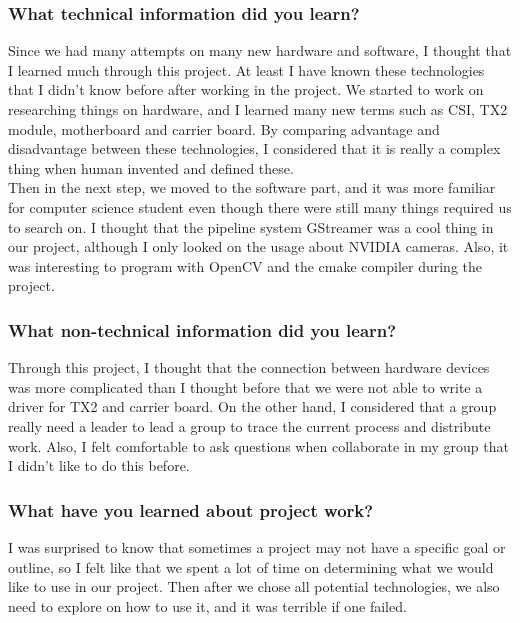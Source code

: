 \subsubsection{What technical information did you learn?}
Since we had many attempts on many new hardware and software, I thought that I learned much through 
this project. At least I have known these technologies that I didn't know before after working in the
 project. We started to work on researching things on hardware, and I learned many new terms such as 
 CSI, TX2 module, motherboard and carrier board. By comparing advantage and disadvantage between these 
 technologies, I considered that it is really a complex thing when human invented and defined these. \\

 Then in the next step, we moved to the software part, and it was more familiar for computer science 
 student even though there were still many things required us to search on. I thought that the pipeline 
 system GStreamer was a cool thing in our project, although I only looked on the usage about NVIDIA cameras. 
 Also, it was interesting to program with OpenCV and the cmake compiler during the project. \\

\subsubsection{What non-technical information did you learn?}
Through this project, I thought that the connection between hardware devices was more complicated than
 I thought before that we were not able to write a driver for TX2 and carrier board. On the other hand, 
 I considered that a group really need a leader to lead a group to trace the current process and 
 distribute work. Also, I felt comfortable to ask questions when collaborate in my group that I didn't 
 like to do this before. \\

\subsubsection{What have you learned about project work?}
I was surprised to know that sometimes a project may not have a specific goal or outline, so I felt like 
that we spent a lot of time on determining what we would like to use in our project. Then after we 
chose all potential technologies, we also need to explore on how to use it, and it was terrible 
if one failed. \\


